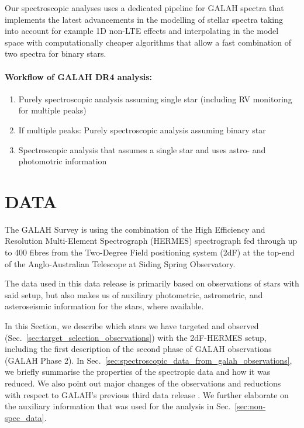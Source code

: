 \documentclass[
  journal=pasa,
  manuscript=research-paper, %
  year=2021,
  volume=37
]{cup-journal}
\begin{document}
Our spectroscopic analyses uses a dedicated pipeline for GALAH spectra that implements the latest advancements in the modelling of stellar spectra taking into account for example 1D non-LTE effects and interpolating in the model space with computationally cheaper algorithms that allow a fast combination of two spectra for binary stars.

\paragraph{Workflow of GALAH DR4 analysis:}
\begin{enumerate}
    \item Purely spectroscopic analysis assuming single star (including RV monitoring for multiple peaks)
    \item If multiple peaks: Purely spectroscopic analysis assuming binary star
    \item Spectroscopic analysis that assumes a single star and uses astro- and photomotric information
\end{enumerate}

\section{DATA}
\label{sec:data}

The GALAH Survey is using the combination of the High Efficiency and Resolution Multi-Element Spectrograph (HERMES) spectrograph fed through up to 400 fibres from the Two-Degree Field positioning system (2dF) at the top-end of the Anglo-Australian Telescope at Siding Spring Observatory.

The data used in this data release is primarily based on observations of stars with said setup, but also makes us of auxiliary photometric, astrometric, and asteroseismic information for the stars, where available.

In this Section, we describe which stars we have targeted and observed (Sec.~\ref{sec:target_selection_observations}) with the 2dF-HERMES setup, including the first description of the second phase of GALAH observations (GALAH Phase 2). In Sec.~\ref{sec:spectroscopic_data_from_galah_observations}, we briefly summarise the properties of the spectropic data and how it was reduced. We also point out major changes of the observations and reductions with respect to GALAH's previous third data release \citep{Buder2021}. We further elaborate on the auxiliary information that was used for the analysis in Sec.~\ref{sec:non-spec_data}.
\end{document}
